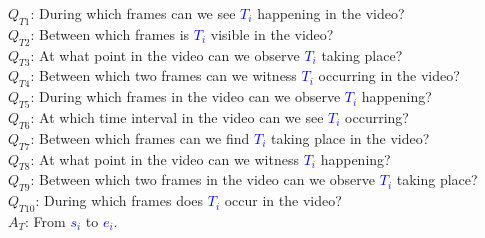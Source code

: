 \documentclass[10pt,twocolumn,letterpaper]{article}
\begin{document}
\begin{figure*}[t]
\begin{tcolorbox}[colback=gray!20, colframe=black, text width=0.9\textwidth, title={Box 3: Templates to transform events $\{s_i, e_i, T_i\}$ into QA dialogues, 10 templates for each task.}]
$Q_{T1}$: During which frames can we see \textcolor{blue}{$T_i$} happening in the video? \\ 
$Q_{T2}$: Between which frames is \textcolor{blue}{$T_i$} visible in the video? \\ 
$Q_{T3}$: At what point in the video can we observe \textcolor{blue}{$T_i$} taking place? \\ 
$Q_{T4}$: Between which two frames can we witness \textcolor{blue}{$T_i$} occurring in the video? \\ 
$Q_{T5}$: During which frames in the video can we observe \textcolor{blue}{$T_i$} happening? \\ 
$Q_{T6}$: At which time interval in the video can we see \textcolor{blue}{$T_i$} occurring? \\ 
$Q_{T7}$: Between which frames can we find \textcolor{blue}{$T_i$} taking place in the video? \\ 
$Q_{T8}$: At what point in the video can we witness \textcolor{blue}{$T_i$} happening? \\ 
$Q_{T9}$: Between which two frames in the video can we observe \textcolor{blue}{$T_i$} taking place? \\ 
$Q_{T10}$: During which frames does \textcolor{blue}{$T_i$} occur in the video? \\
$A_{T}$: From \textcolor{blue}{$s_i$} to \textcolor{blue}{$e_i$}. \\


\end{tcolorbox}

\end{figure*} \begin{figure*}[t] \centering

\begin{tcolorbox}[colback=gray!20, colframe=black, text width=0.9\textwidth, title={Box 4: Prompt for LLM in Stage 3, designed to transform a series of events into high-quality dialogue.}]
\hypertarget{box4}{}


\end{tcolorbox}
\end{figure*}
\end{document}
